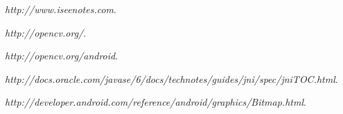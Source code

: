 \documentclass[pdftex,11pt,a4paper]{article}
\begin{document}


\renewcommand{\abstractname}{Executive Summary}

\tableofcontents
\listoffigures
\listoftables







\begin{thebibliography}{9}

  \emph{http://www.iseenotes.com}.

  \emph{http://opencv.org/}.

  \emph{http://opencv.org/android}.

  \emph{http://docs.oracle.com/javase/6/docs/technotes/guides/jni/spec/jniTOC.html}.

  \emph{http://developer.android.com/reference/android/graphics/Bitmap.html}.

\end{thebibliography}
\end{document}
